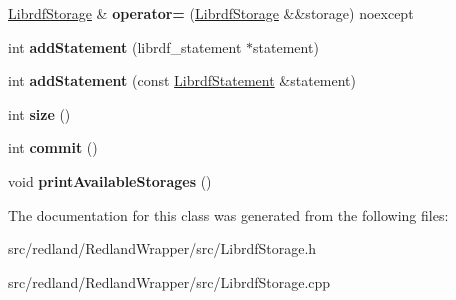 \begin{DoxyCompactItemize}
\hyperlink{classredland_1_1LibrdfStorage}{Librdf\+Storage} \& {\bfseries operator=} (\hyperlink{classredland_1_1LibrdfStorage}{Librdf\+Storage} \&\&storage) noexcept
\item 
\mbox{\label{classredland_1_1LibrdfStorage_a3782ab4a08a32bd23a38eaad9c980fe9}} 
int {\bfseries add\+Statement} (librdf\+\_\+statement $\ast$statement)
\item 
\mbox{\label{classredland_1_1LibrdfStorage_ae5e7a3708936893c9e553cbdc23d643a}} 
int {\bfseries add\+Statement} (const \hyperlink{classredland_1_1LibrdfStatement}{Librdf\+Statement} \&statement)
\item 
\mbox{\label{classredland_1_1LibrdfStorage_a31ecaace536dface7d4a667ccf8db06c}} 
int {\bfseries size} ()
\item 
\mbox{\label{classredland_1_1LibrdfStorage_afb361eb4addaf74b725d63fed2cb38e6}} 
int {\bfseries commit} ()
\item 
\mbox{\label{classredland_1_1LibrdfStorage_a93cc1f3c7e7ff2a250c9b14f66f60e39}} 
void {\bfseries print\+Available\+Storages} ()
\end{DoxyCompactItemize}


The documentation for this class was generated from the following files\+:\begin{DoxyCompactItemize}
\item 
src/redland/\+Redland\+Wrapper/src/Librdf\+Storage.\+h\item 
src/redland/\+Redland\+Wrapper/src/Librdf\+Storage.\+cpp\end{DoxyCompactItemize}
